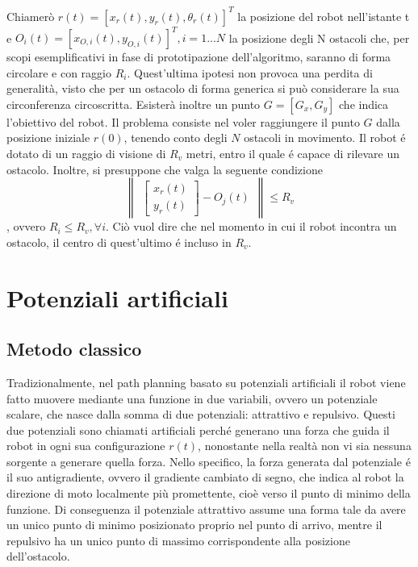 \documentclass[14pt,a4paper]{extarticle}
\begin{document}
Chiamerò \( r(t) = [x_r(t),y_r(t),\theta_r(t)]^T\) la posizione del robot nell'istante t e \( O_i(t) = [x_{O,i}(t),y_{O,i}(t)]^T, i = 1...N\) la posizione degli N ostacoli che, per scopi esemplificativi in fase di prototipazione dell'algoritmo, saranno di forma circolare e con raggio \(R_i\). Quest'ultima ipotesi non provoca una perdita di generalità, visto che per un ostacolo di forma generica si può considerare la sua circonferenza circoscritta. Esisterà inoltre un punto \(G = [G_x, G_y]\) che indica l'obiettivo del robot. Il problema consiste nel voler raggiungere il punto \(G\) dalla posizione iniziale \(r(0)\), tenendo conto degli \(N\) ostacoli in movimento. Il robot é dotato di un raggio di visione di \(R_v\) metri, entro il quale é capace di rilevare un ostacolo. Inoltre, si presuppone che valga la seguente condizione
\[\begin{Vmatrix}\begin{bmatrix} x_r(t)\\ y_r(t) \end{bmatrix} - O_j(t)\end{Vmatrix} \leq R_v \], ovvero \( R_i \leq R_v, \forall i\). Ciò vuol dire che nel momento in cui il robot incontra un ostacolo, il centro di quest'ultimo é incluso in \(R_v\). \newpage

\section{Potenziali artificiali}

\subsection{Metodo classico}
Tradizionalmente, nel path planning basato su potenziali artificiali il robot viene fatto muovere mediante una funzione in due variabili, ovvero un potenziale scalare, che nasce dalla somma di due potenziali: attrattivo e repulsivo. Questi due potenziali sono chiamati artificiali perché generano una forza che guida il robot in ogni sua configurazione \( r(t)\), nonostante nella realtà non vi sia nessuna sorgente a generare quella forza. Nello specifico, la forza generata dal potenziale é il suo antigradiente, ovvero il gradiente cambiato di segno, che indica al robot la direzione di moto localmente più promettente\cite{oriolo}, cioè verso il punto di minimo della funzione. Di conseguenza il potenziale attrattivo assume una forma tale da avere un unico punto di minimo posizionato proprio nel punto di arrivo, mentre il repulsivo ha un unico punto di massimo corrispondente alla posizione dell'ostacolo. 
\end{document}
